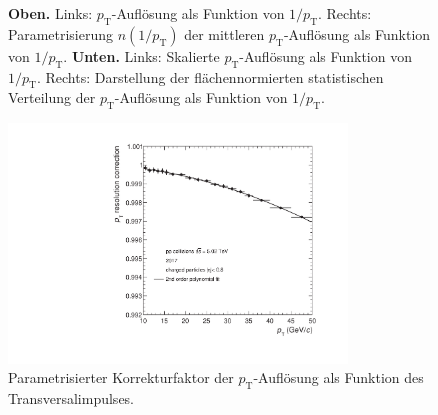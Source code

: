 \documentclass[12pt,a4paper]{report}
\begin{document}
\begin{figure}[tb!]
\caption{\textbf{Oben.} Links: $p_{\mathrm{T}}$-Auflösung als Funktion von $1/p_{\mathrm{T}}$. Rechts: Parametrisierung $n(1/p_{\mathrm{T}})$ der mittleren $p_{\mathrm{T}}$-Auflösung als Funktion von $1/p_{\mathrm{T}}$. \textbf{Unten.} Links: Skalierte $p_{\mathrm{T}}$-Auflösung als Funktion von $1/p_{\mathrm{T}}$. Rechts: Darstellung der flächennormierten statistischen Verteilung der $p_{\mathrm{T}}$-Auflösung als Funktion von $1/p_{\mathrm{T}}$.}
\label{4plots}
\end{figure}

\begin{figure}[tb!]
\centering
\includegraphics[width=9cm]{Plots/corrResFactor.pdf}  
\caption{Parametrisierter Korrekturfaktor der $p_{\mathrm{T}}$-Auflösung als Funktion des Transversalimpulses.}
\label{corrResFactor}
\end{figure}
\end{document}
